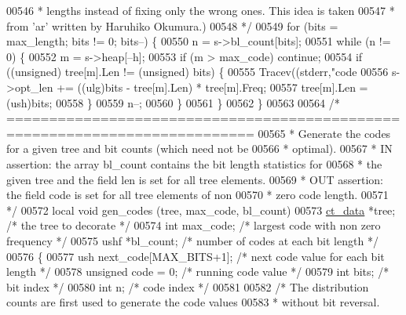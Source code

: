 \begin{DoxyCode}
{{{{{{{{{00546 \textcolor{comment}{     * lengths instead of fixing only the wrong ones. This idea is taken}
00547 \textcolor{comment}{     * from 'ar' written by Haruhiko Okumura.)}
00548 \textcolor{comment}{     */}
00549     \textcolor{keywordflow}{for} (bits = max\_length; bits != 0; bits--) \{
00550         n = s->bl\_count[bits];
00551         \textcolor{keywordflow}{while} (n != 0) \{
00552             m = s->heap[--h];
00553             \textcolor{keywordflow}{if} (m > max\_code) \textcolor{keywordflow}{continue};
00554             \textcolor{keywordflow}{if} ((\textcolor{keywordtype}{unsigned}) tree[m].Len != (\textcolor{keywordtype}{unsigned}) bits) \{
00555                 Tracev((stderr,\textcolor{stringliteral}{"code %
00556                 s->opt\_len += ((ulg)bits - tree[m].Len) * tree[m].Freq;
00557                 tree[m].Len = (ush)bits;
00558             \}
00559             n--;
00560         \}
00561     \}
00562 \}
00563 
00564 \textcolor{comment}{/* ===========================================================================}
00565 \textcolor{comment}{ * Generate the codes for a given tree and bit counts (which need not be}
00566 \textcolor{comment}{ * optimal).}
00567 \textcolor{comment}{ * IN assertion: the array bl\_count contains the bit length statistics for}
00568 \textcolor{comment}{ * the given tree and the field len is set for all tree elements.}
00569 \textcolor{comment}{ * OUT assertion: the field code is set for all tree elements of non}
00570 \textcolor{comment}{ *     zero code length.}
00571 \textcolor{comment}{ */}
00572 local \textcolor{keywordtype}{void} gen\_codes (tree, max\_code, bl\_count)
00573     \hyperlink{structct__data__s}{ct\_data} *tree;             \textcolor{comment}{/* the tree to decorate */}
00574     \textcolor{keywordtype}{int} max\_code;              \textcolor{comment}{/* largest code with non zero frequency */}
00575     ushf *bl\_count;            \textcolor{comment}{/* number of codes at each bit length */}
00576 \{
00577     ush next\_code[MAX\_BITS+1]; \textcolor{comment}{/* next code value for each bit length */}
00578     \textcolor{keywordtype}{unsigned} code = 0;         \textcolor{comment}{/* running code value */}
00579     \textcolor{keywordtype}{int} bits;                  \textcolor{comment}{/* bit index */}
00580     \textcolor{keywordtype}{int} n;                     \textcolor{comment}{/* code index */}
00581 
00582     \textcolor{comment}{/* The distribution counts are first used to generate the code values}
00583 \textcolor{comment}{     * without bit reversal.}
}}}}}}}}}}
\end{DoxyCode}
